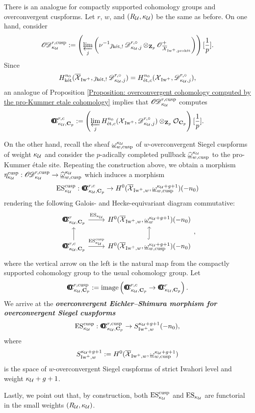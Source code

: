 \begin{Remark}\label{Remark: OES for cuspforms}
\normalfont There is an analogue for compactly supported cohomology groups and overconvergent cuspforms. Let $r$, $w$, and $(R_{\calU}, \kappa_{\calU})$ be the same as before. On one hand, consider
$$\sheafOD_{\kappa_{\calU}}^{r, \cusp}:=\left(\varprojlim_{j}\left(\nu^{-1}\jmath_{\ket, !}\scrD_{\kappa_{\calU}, j}^{r, \circ}\otimes_{\Z_p}\scrO_{\overline{\calX}_{\Iw^+, \proket}}^+\right)\right)[\frac{1}{p}].$$
Since \[H_{\ket}^{n_0}(\overline{\calX}_{\Iw^+}, \jmath_{\ket, !}\scrD_{\kappa_{\calU}, j}^{r, \circ})=H^{n_0}_{\et, c}(\calX_{\Iw^+}, \scrD_{\kappa_{\calU}, j}^{r, \circ}),\] an analogue of Proposition \ref{Proposition: overconvergent cohomology computed by the pro-Kummer etale cohomology} implies that $\sheafOD_{\kappa_{\calU}}^{r, \cusp}$ computes \[
    \OC_{\kappa_{\calU}, \C_p}^{r, c}:=\left(\varprojlim_{j}H_{\et, c}^{n_0}(\calX_{\Iw^+}, \scrD_{\kappa_{\calU}, j}^{r, \circ})\otimes_{\Z_p}\calO_{\C_p}\right)[\frac{1}{p}].
\]

On the other hand, recall the sheaf $\underline{\omega}_{w, \cusp}^{\kappa_{\calU}}$ of $w$-overconvergent Siegel cuspforms of weight $\kappa_{\calU}$ and consider the $p$-adically completed pullback $\widehat{\underline{\omega}}_{w, \cusp}^{\kappa_{\calU}}$ to the pro-Kummer \'etale site. Repeating the construction above, we obtain a morphism $\eta_{\kappa_{\calU}}^{\cusp}: \sheafOD_{\kappa_{\calU}}^{r, \cusp}\rightarrow \widehat{\underline{\omega}}_{w, \cusp}^{\kappa_{\calU}}$ which induces a morphism
\[\ES_{\kappa_{\calU}}^{\cusp}:\OC_{\kappa_{\calU}, \C_p}^{r, c}\rightarrow H^0(\overline{\calX}_{\Iw^+, w}, \underline{\omega}_{w, \cusp}^{\kappa_{\calU}+g+1})(-n_0)
\]
rendering the following Galois- and Hecke-equivariant diagram commutative:
$$\begin{tikzcd}
\OC_{\kappa_{\calU}, \C_p}^{r}\arrow[r, "\ES_{\kappa_{\calU}}"] & H^0(\overline{\calX}_{\Iw^+, w}, \underline{\omega}_{w}^{\kappa_{\calU}+g+1})(-n_0)\\
\OC_{\kappa_{\calU}, \C_p}^{r, c}\arrow[r, "\ES_{\kappa_{\calU}}^{\cusp}"]\arrow[u] & H^0(\overline{\calX}_{\Iw^+, w}, \underline{\omega}_{w, \cusp}^{\kappa_{\calU}+g+1})(-n_0)\arrow[u, hook]
\end{tikzcd},$$ where the vertical arrow on the left is the natural map from the compactly supported cohomology group to the usual cohomology group. Let \[\OC_{\kappa_{\calU}, \C_p}^{r, \cusp}:=\image\left(\OC_{\kappa_{\calU}, \C_p}^{r, c}\rightarrow \OC_{\kappa_{\calU}, \C_p}^{r}\right).\] We arrive at the \textbf{\textit{overconvergent Eichler--Shimura morphism for overconvergent Siegel cuspforms}} $$\ES_{\kappa_{\calU}}^{\cusp}: \OC_{\kappa_{\calU}, \C_p}^{r, \cusp}\rightarrow S_{\Iw^+, w}^{\kappa_{\calU}+g+1}(-n_0),$$ where
\[S_{\Iw^+, w}^{\kappa_{\calU}+g+1}:=H^0(\overline{\calX}_{\Iw^+, w}, \underline{\omega}_{w, \cusp}^{\kappa_{\calU}+g+1})\]
is the space of $w$-overconvergent Siegel cuspforms of strict Iwahori level and weight $\kappa_{\calU}+g+1$.

Lastly, we point out that, by construction, both $\ES_{\kappa_{\calU}}^{\cusp}$ and $\ES_{\kappa_{\calU}}$ are functorial in the small weights $(R_{\calU}, \kappa_{\calU})$.
\end{Remark}


